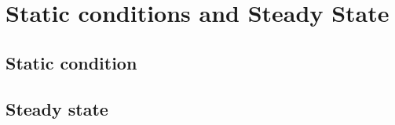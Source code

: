 \chapter{Static conditions and Steady State}
\label{Ch:SS}
%
\section{Static condition}
%

\section{Steady state}
%

